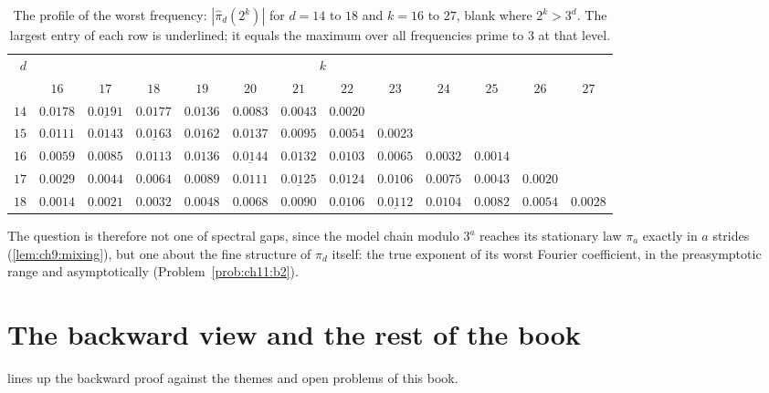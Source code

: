 \begin{table}[t]
\centering\footnotesize
\setlength{\tabcolsep}{3pt}
\caption{The profile of the worst frequency: $|\widehat\pi_d(2^k)|$ for $d=14$ to $18$ and $k=16$ to $27$, blank where $2^k>3^d$. The largest entry of each row is underlined; it equals the maximum over all frequencies prime to $3$ at that level.}
\label{tab:ch9b:profile}
\begin{tabular}{@{}rcccccccccccc@{}}
\toprule
$d$ & \multicolumn{12}{c}{$k$} \\
\cmidrule(l){2-13}
 & $16$ & $17$ & $18$ & $19$ & $20$ & $21$ & $22$ & $23$ & $24$ & $25$ & $26$ & $27$ \\
\midrule
$14$ & $0.0178$ & $\underline{0.0191}$ & $0.0177$ & $0.0136$ & $0.0083$ & $0.0043$ & $0.0020$ &  &  &  &  &  \\
$15$ & $0.0111$ & $0.0143$ & $\underline{0.0163}$ & $0.0162$ & $0.0137$ & $0.0095$ & $0.0054$ & $0.0023$ &  &  &  &  \\
$16$ & $0.0059$ & $0.0085$ & $0.0113$ & $0.0136$ & $\underline{0.0144}$ & $0.0132$ & $0.0103$ & $0.0065$ & $0.0032$ & $0.0014$ &  &  \\
$17$ & $0.0029$ & $0.0044$ & $0.0064$ & $0.0089$ & $0.0111$ & $\underline{0.0125}$ & $0.0124$ & $0.0106$ & $0.0075$ & $0.0043$ & $0.0020$ &  \\
$18$ & $0.0014$ & $0.0021$ & $0.0032$ & $0.0048$ & $0.0068$ & $0.0090$ & $0.0106$ & $\underline{0.0112}$ & $0.0104$ & $0.0082$ & $0.0054$ & $0.0028$ \\
\bottomrule
\end{tabular}
\end{table}

The question is therefore not one of spectral gaps, since the model chain modulo $3^a$ reaches its stationary law $\pi_a$ exactly in $a$ strides (\cref{lem:ch9:mixing}), but one about the fine structure of $\pi_d$ itself: the true exponent of its worst Fourier coefficient, in the preasymptotic range and asymptotically (Problem~\ref{prob:ch11:b2}).

\section{The backward view and the rest of the book}\label{sec:ch9b:book}

 lines up the backward proof against the themes and open problems of this book.

